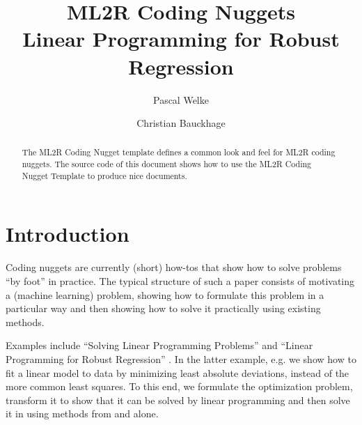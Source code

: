 \documentclass[fleqn,svgnames]{ml2rcn}
\begin{document}


\title[Linear Programming for Robust Regression]{ML2R Coding Nuggets \\ Linear Programming for Robust Regression}


\author[P. Welke]{Pascal Welke}

\author[C. Bauckhage]{Christian Bauckhage}

\begin{abstract}
The ML2R Coding Nugget template defines a common look and feel for ML2R coding nuggets. 
The source code of this document shows how to use the ML2R Coding Nugget Template to produce nice documents.
\end{abstract}

\maketitle



\section{Introduction}
Coding nuggets are currently (short) how-tos that show how to solve problems ``by foot'' in practice.
The typical structure of such a paper consists of motivating a (machine learning) problem, showing how to formulate this problem in a particular way and then showing how to solve it practically using existing methods. 

Examples include  ``Solving Linear Programming Problems'' \cite{Welke2020-SLP} and ``Linear Programming for Robust Regression'' \cite{Welke2020-SLP2}.
In the latter example, e.g. we show how to fit a linear model to data by minimizing least absolute deviations, instead of the more common least squares. 
To this end, we formulate the optimization problem, transform it to show that it can be solved by linear programming and then solve it in  using methods from  and  alone.  
\end{document}
